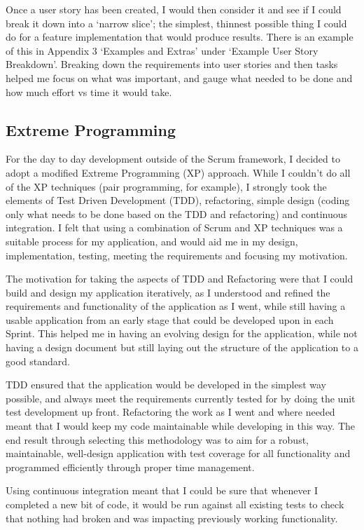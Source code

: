 Once a user story has been created, I would then consider it and see if I could break it down into a `narrow slice'; the simplest, thinnest possible thing I could do for a feature implementation that would produce results. There is an example of this in Appendix 3 `Examples and Extras' under `Example User Story Breakdown'. Breaking down the requirements into user stories and then tasks helped me focus on what was important, and gauge what needed to be done and how much effort vs time it would take.

\subsection{Extreme Programming}
For the day to day development outside of the Scrum framework, I decided to adopt a modified Extreme Programming (XP) approach\cite{xp}. While I couldn't do all of the XP techniques (pair programming, for example), I strongly took the elements of Test Driven Development (TDD), refactoring, simple design (coding only what needs to be done based on the TDD and refactoring) and continuous integration. I felt that using a combination of Scrum and XP techniques was a suitable process for my application, and would aid me in my design, implementation, testing, meeting the requirements and focusing my motivation.

The motivation for taking the aspects of TDD and Refactoring were that I could build and design my application iteratively, as I understood and refined the requirements and functionality of the application as I went, while still having a usable application from an early stage that could be developed upon in each Sprint. This helped me in having an evolving design for the application, while not having a design document but still laying out the structure of the application to a good standard.

TDD ensured that the application would be developed in the simplest way possible, and always meet the requirements currently tested for by doing the unit test development up front. Refactoring the work as I went and where needed meant that I would keep my code maintainable while developing in this way. The end result through selecting this methodology was to aim for a robust, maintainable, well-design application with test coverage for all functionality and programmed efficiently through proper time management.

Using continuous integration meant that I could be sure that whenever I completed a new bit of code, it would be run against all existing tests to check that nothing had broken and was impacting previously working functionality.

